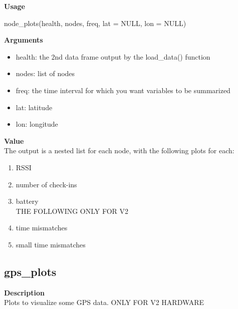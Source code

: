 \documentclass[
]{book}
\newenvironment{Shaded}{\begin{snugshade}}{\end{snugshade}}
\newcommand{\AttributeTok}[1]{\textcolor[rgb]{0.77,0.63,0.00}{#1}}
\newcommand{\ConstantTok}[1]{\textcolor[rgb]{0.00,0.00,0.00}{#1}}
\newcommand{\FunctionTok}[1]{\textcolor[rgb]{0.00,0.00,0.00}{#1}}
\newcommand{\NormalTok}[1]{#1}
\providecommand{\tightlist}{%
  \setlength{\itemsep}{0pt}\setlength{\parskip}{0pt}}
\begin{document}
\textbf{Usage}

\begin{Shaded}
\begin{Highlighting}[]
\FunctionTok{node\_plots}\NormalTok{(health, nodes, freq, }\AttributeTok{lat =} \ConstantTok{NULL}\NormalTok{, }\AttributeTok{lon =} \ConstantTok{NULL}\NormalTok{)}
\end{Highlighting}
\end{Shaded}

\textbf{Arguments}

\begin{itemize}
\tightlist
\item
  health: the 2nd data frame output by the load\_data() function\\
\item
  nodes: list of nodes\\
\item
  freq: the time interval for which you want variables to be summarized\\
\item
  lat: latitude\\
\item
  lon: longitude
\end{itemize}

\textbf{Value}\\
The output is a nested list for each node, with the following plots for each:

\begin{enumerate}
\def\labelenumi{\arabic{enumi}.}
\tightlist
\item
  RSSI\\
\item
  number of check-ins\\
\item
  battery\\
  THE FOLLOWING ONLY FOR V2\\
\item
  time mismatches\\
\item
  small time mismatches
\end{enumerate}

\hypertarget{gps_plots}{%
\subsection{gps\_plots}\label{gps_plots}}

\textbf{Description}\\
Plots to visualize some GPS data. ONLY FOR V2 HARDWARE
\end{document}
